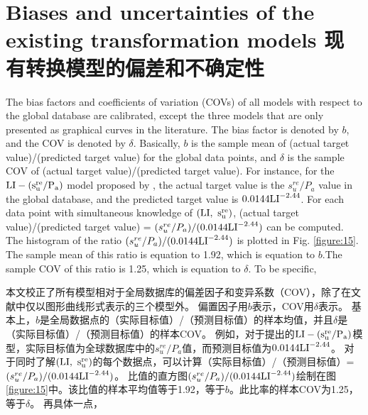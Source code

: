 \section{Biases and uncertainties of the existing transformation models 现有转换模型的偏差和不确定性}

\begin{Parallel}{0.60\textwidth}{}
    \ParallelLText
    {
        The bias factors and coefficients of variation (COVs) of all models with respect to the global database are calibrated, except the three models that are only presented as graphical curves in the literature. The bias factor is denoted by $b$, and the COV is denoted by $\delta$. Basically, $b$ is the sample mean of (actual target value)/(predicted target value) for the global data points, and $\delta$ is the sample COV of (actual target value)/(predicted target value). For instance, for the $\rm{LI}-(s_u^{re}/P_a)$ model proposed by \citet{Locat1988799}, the actual target value is the $s_u^{re}/P_a$ value in the global database, and the predicted target value is $0.0144\rm{LI}^{-2.44}$. For each data point with simultaneous knowledge of $(\rm{LI},~s_u^{re})$, (actual target value)/(predicted target value) = $(s_u^{re}/P_a)/(0.0144\rm{LI}^{-2.44})$ can be computed. The histogram of the ratio $(s_u^{re}/P_a)/(0.0144\rm{LI}^{-2.44})$ is plotted in Fig. \ref{figure:15}. The sample mean of this ratio is equation to 1.92, which is equation to $b$.The sample COV of this ratio is 1.25, which is  equation to $\delta$. To be specific,
    }
    \ParallelRText
    {
        本文校正了所有模型相对于全局数据库的偏差因子和变异系数（COV），除了在文献中仅以图形曲线形式表示的三个模型外。 偏置因子用$b$表示，COV用$\delta$表示。 基本上，$b$是全局数据点的（实际目标值）/（预测目标值）的样本均值，并且$\delta$是（实际目标值）/（预测目标值）的样本COV。 例如，对于\citet{Locat1988799}提出的$\rm{LI}-(s_u^{re}/P_a)$模型，实际目标值为全球数据库中的$s_u^{re}/P_a$值，而预测目标值为$0.0144\rm{LI}^{-2.44}$。 对于同时了解$(\rm{LI},~s_u^{re})$的每个数据点，可以计算（实际目标值）/（预测目标值）= $(s_u^{re}/P_a)/(0.0144\rm{LI}^{-2.44})$。 比值的直方图$(s_u^{re}/P_a)/(0.0144\rm{LI}^{-2.44})$绘制在图\ref{figure:15}中。该比值的样本平均值等于1.92，等于$b$。此比率的样本COV为1.25，等于$\delta$。 再具体一点，
        
}
\end{Parallel}
